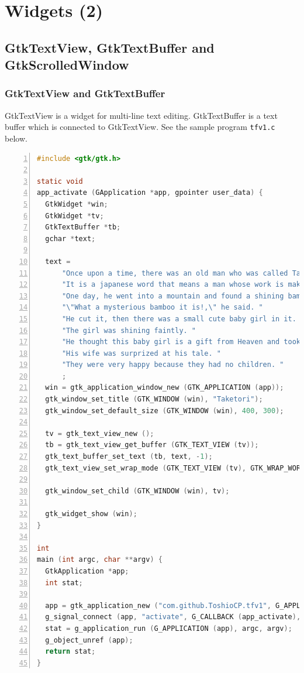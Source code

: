 \hypertarget{widgets-2}{%
\section{Widgets (2)}\label{widgets-2}}

\hypertarget{gtktextview-gtktextbuffer-and-gtkscrolledwindow}{%
\subsection{GtkTextView, GtkTextBuffer and
GtkScrolledWindow}\label{gtktextview-gtktextbuffer-and-gtkscrolledwindow}}

\hypertarget{gtktextview-and-gtktextbuffer}{%
\subsubsection{GtkTextView and
GtkTextBuffer}\label{gtktextview-and-gtktextbuffer}}

GtkTextView is a widget for multi-line text editing. GtkTextBuffer is a
text buffer which is connected to GtkTextView. See the sample program
\passthrough{\lstinline!tfv1.c!} below.

\begin{lstlisting}[language=C, numbers=left]
#include <gtk/gtk.h>

static void
app_activate (GApplication *app, gpointer user_data) {
  GtkWidget *win;
  GtkWidget *tv;
  GtkTextBuffer *tb;
  gchar *text;

  text =
      "Once upon a time, there was an old man who was called Taketori-no-Okina. "
      "It is a japanese word that means a man whose work is making bamboo baskets.\n"
      "One day, he went into a mountain and found a shining bamboo. "
      "\"What a mysterious bamboo it is!,\" he said. "
      "He cut it, then there was a small cute baby girl in it. "
      "The girl was shining faintly. "
      "He thought this baby girl is a gift from Heaven and took her home.\n"
      "His wife was surprized at his tale. "
      "They were very happy because they had no children. "
      ;
  win = gtk_application_window_new (GTK_APPLICATION (app));
  gtk_window_set_title (GTK_WINDOW (win), "Taketori");
  gtk_window_set_default_size (GTK_WINDOW (win), 400, 300);

  tv = gtk_text_view_new ();
  tb = gtk_text_view_get_buffer (GTK_TEXT_VIEW (tv));
  gtk_text_buffer_set_text (tb, text, -1);
  gtk_text_view_set_wrap_mode (GTK_TEXT_VIEW (tv), GTK_WRAP_WORD_CHAR);

  gtk_window_set_child (GTK_WINDOW (win), tv);

  gtk_widget_show (win);
}

int
main (int argc, char **argv) {
  GtkApplication *app;
  int stat;

  app = gtk_application_new ("com.github.ToshioCP.tfv1", G_APPLICATION_FLAGS_NONE);
  g_signal_connect (app, "activate", G_CALLBACK (app_activate), NULL);
  stat = g_application_run (G_APPLICATION (app), argc, argv);
  g_object_unref (app);
  return stat;
}
\end{lstlisting}

